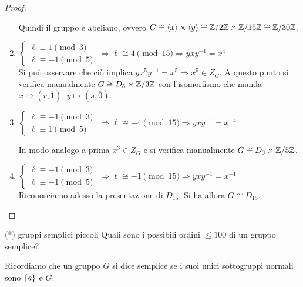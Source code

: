 \begin{proof}
\begin{enumerate}
        Quindi il gruppo è abeliano, ovvero $G \cong \langle x \rangle \times \langle y \rangle \cong \mathbb{Z}/2\mathbb{Z} \times \mathbb{Z}/15\mathbb{Z} \cong \mathbb{Z}/30\mathbb{Z}$.
        
        \item
        $\begin{cases}
        \ell \equiv  1 \pmod{3} \\
        \ell \equiv  -1 \pmod{5} 
        \end{cases}$  $\Rightarrow \ell \cong 4 \pmod{15} \Rightarrow yxy^{-1} = x^4$ \\
        Si può osservare che ciò implica $yx^5y^{-1} = x^5  \Rightarrow x^5 \in Z_G$. 
        A questo punto si verifica manualmente $G \cong D_5 \times \mathbb{Z}/3\mathbb{Z}$ con l'isomorfismo che manda $x \mapsto (r,\overline{1})$, $y \mapsto (s,\overline{0})$.
        
        \item
        $\begin{cases}
        \ell \equiv  -1 \pmod{3} \\
        \ell \equiv  1 \pmod{5} 
        \end{cases}$  $\Rightarrow \ell \cong -4 \pmod{15} \Rightarrow yxy^{-1} = x^{-4}$
        
        In modo analogo a prima $x^3 \in Z_G$ e si verifica manualmente $G \cong D_3 \times \mathbb{Z}/5\mathbb{Z}$.
        
        \item
        $\begin{cases}
        \ell \equiv  -1 \pmod{3} \\
        \ell \equiv  -1 \pmod{5} 
        \end{cases}$ $\Rightarrow \ell \cong -1 \pmod{15} \Rightarrow yxy^{-1} = x^{-1}$ \\ Riconosciamo adesso la presentazione di $D_{15}$. Si ha allora $G \cong D_{15}$. 
    \end{enumerate}
\end{proof}
\begin{example2}{(*) gruppi semplici piccoli}
    Quali sono i possibili ordini $\leq 100$ di un gruppo semplice?

    Ricordiamo che un gruppo $G$ si dice semplice se i suoi unici sottogruppi normali sono $\left\{ e \right\}$ e $G$. 
\end{example2}
